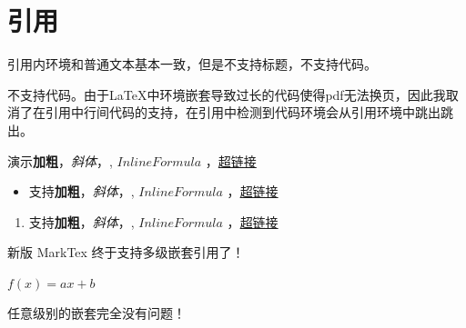 \documentclass{article}%
\begin{document}
%
\normalsize%
%

%
\section{引用}%

%
\begin{markquote}%
引用内环境和普通文本基本一致，但是不支持标题，不支持代码。%

%
不支持代码。由于LaTeX中环境嵌套导致过长的代码使得pdf无法换页，因此我取消了在引用中行间代码的支持，在引用中检测到代码环境会从引用环境中跳出跳出。%

%
演示\textbf{加粗}，\textit{斜体}，, $Inline Formula$ ，\href{http:///www.github.com}{超链接}%

%
\begin{itemize}%
\item%
支持\textbf{加粗}，\textit{斜体}，, $Inline Formula$ ，\href{http:///www.github.com}{超链接}%
\end{itemize}%

%
\begin{enumerate}%
\item%
支持\textbf{加粗}，\textit{斜体}，, $Inline Formula$ ，\href{http:///www.github.com}{超链接}%
\end{enumerate}%

%
\begin{markquote}%

%

%
新版 MarkTex 终于支持多级嵌套引用了！%

%
\begin{markquote}%
\begin{markquote}%
\begin{markquote}%
\begin{markquote}%
 $ f(x) = ax+b$ %

%
\end{markquote}%

%
\end{markquote}%

%
\end{markquote}%

%
\end{markquote}%

%
任意级别的嵌套完全没有问题！%

%
\end{markquote}%

%

%

%
\end{markquote}%
%
\end{document}
